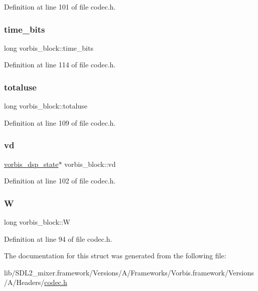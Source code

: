 Definition at line 101 of file codec.\+h.

\mbox{\label{structvorbis__block_ab92eba2cf1a653478630617ddad97f88}} 
\subsubsection{\texorpdfstring{time\_bits}{time\_bits}}
{\footnotesize\ttfamily long vorbis\+\_\+block\+::time\+\_\+bits}



Definition at line 114 of file codec.\+h.

\mbox{\label{structvorbis__block_a24008023c086b4a0eb8b72761cfcf338}} 
\subsubsection{\texorpdfstring{totaluse}{totaluse}}
{\footnotesize\ttfamily long vorbis\+\_\+block\+::totaluse}



Definition at line 109 of file codec.\+h.

\mbox{\label{structvorbis__block_adefe79be61ef3631c18cd7b8afae31a2}} 
\subsubsection{\texorpdfstring{vd}{vd}}
{\footnotesize\ttfamily \mbox{\hyperlink{structvorbis__dsp__state}{vorbis\+\_\+dsp\+\_\+state}}$\ast$ vorbis\+\_\+block\+::vd}



Definition at line 102 of file codec.\+h.

\mbox{\label{structvorbis__block_a1e420440dd6a5a39262c0fe7afa8435a}} 
\subsubsection{\texorpdfstring{W}{W}}
{\footnotesize\ttfamily long vorbis\+\_\+block\+::W}



Definition at line 94 of file codec.\+h.



The documentation for this struct was generated from the following file\+:\begin{DoxyCompactItemize}
\item 
lib/\+S\+D\+L2\+\_\+mixer.\+framework/\+Versions/\+A/\+Frameworks/\+Vorbis.\+framework/\+Versions/\+A/\+Headers/\mbox{\hyperlink{codec_8h}{codec.\+h}}\end{DoxyCompactItemize}

